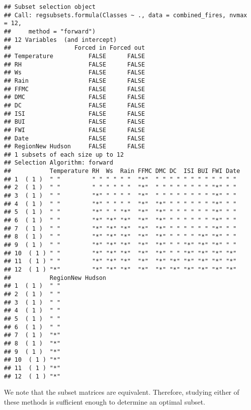 \documentclass[
]{article}
\begin{document}
\begin{verbatim}
## Subset selection object
## Call: regsubsets.formula(Classes ~ ., data = combined_fires, nvmax = 12, 
##     method = "forward")
## 12 Variables  (and intercept)
##                  Forced in Forced out
## Temperature          FALSE      FALSE
## RH                   FALSE      FALSE
## Ws                   FALSE      FALSE
## Rain                 FALSE      FALSE
## FFMC                 FALSE      FALSE
## DMC                  FALSE      FALSE
## DC                   FALSE      FALSE
## ISI                  FALSE      FALSE
## BUI                  FALSE      FALSE
## FWI                  FALSE      FALSE
## Date                 FALSE      FALSE
## RegionNew Hudson     FALSE      FALSE
## 1 subsets of each size up to 12
## Selection Algorithm: forward
##           Temperature RH  Ws  Rain FFMC DMC DC  ISI BUI FWI Date
## 1  ( 1 )  " "         " " " " " "  "*"  " " " " " " " " " " " " 
## 2  ( 1 )  " "         " " " " " "  "*"  " " " " " " " " "*" " " 
## 3  ( 1 )  " "         "*" " " " "  "*"  " " " " " " " " "*" " " 
## 4  ( 1 )  " "         "*" " " " "  "*"  "*" " " " " " " "*" " " 
## 5  ( 1 )  " "         "*" " " "*"  "*"  "*" " " " " " " "*" " " 
## 6  ( 1 )  " "         "*" "*" "*"  "*"  "*" " " " " " " "*" " " 
## 7  ( 1 )  " "         "*" "*" "*"  "*"  "*" " " " " " " "*" " " 
## 8  ( 1 )  " "         "*" "*" "*"  "*"  "*" " " " " "*" "*" " " 
## 9  ( 1 )  " "         "*" "*" "*"  "*"  "*" " " "*" "*" "*" " " 
## 10  ( 1 ) " "         "*" "*" "*"  "*"  "*" " " "*" "*" "*" "*" 
## 11  ( 1 ) " "         "*" "*" "*"  "*"  "*" "*" "*" "*" "*" "*" 
## 12  ( 1 ) "*"         "*" "*" "*"  "*"  "*" "*" "*" "*" "*" "*" 
##           RegionNew Hudson
## 1  ( 1 )  " "             
## 2  ( 1 )  " "             
## 3  ( 1 )  " "             
## 4  ( 1 )  " "             
## 5  ( 1 )  " "             
## 6  ( 1 )  " "             
## 7  ( 1 )  "*"             
## 8  ( 1 )  "*"             
## 9  ( 1 )  "*"             
## 10  ( 1 ) "*"             
## 11  ( 1 ) "*"             
## 12  ( 1 ) "*"
\end{verbatim}

We note that the subset matrices are equivalent. Therefore, studying
either of these methods is sufficient enough to determine an optimal
subset.
\end{document}
